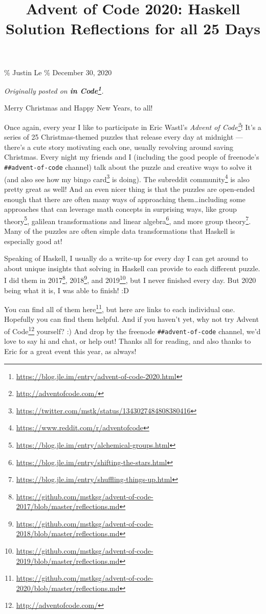 \documentclass[]{article}
\title{Advent of Code 2020: Haskell Solution Reflections for all 25 Days}
\renewcommand{\href}[2]{#2\footnote{\url{#1}}}
\begin{document}
\maketitle

\% Justin Le \% December 30, 2020

\emph{Originally posted on
\textbf{\href{https://blog.jle.im/entry/advent-of-code-2020.html}{in Code}}.}

Merry Christmas and Happy New Years, to all!

Once again, every year I like to participate in Eric Wastl's
\emph{\href{http://adventofcode.com/}{Advent of Code}}! It's a series of 25
Christmas-themed puzzles that release every day at midnight --- there's a cute
story motivating each one, usually revolving around saving Christmas. Every
night my friends and I (including the good people of freenode's
\texttt{\#\#advent-of-code} channel) talk about the puzzle and creative ways to
solve it (and also see how my
\href{https://twitter.com/mstk/status/1343027484808380416}{bingo card} is
doing). The \href{https://www.reddit.com/r/adventofcode}{subreddit community} is
also pretty great as well! And an even nicer thing is that the puzzles are
open-ended enough that there are often many ways of approaching
them\ldots including some approaches that can leverage math concepts in
surprising ways, like
\href{https://blog.jle.im/entry/alchemical-groups.html}{group theory},
\href{https://blog.jle.im/entry/shifting-the-stars.html}{galilean
transformations and linear algebra}, and
\href{https://blog.jle.im/entry/shuffling-things-up.html}{more group theory}.
Many of the puzzles are often simple data transformations that Haskell is
especially good at!

Speaking of Haskell, I usually do a write-up for every day I can get around to
about unique insights that solving in Haskell can provide to each different
puzzle. I did them in
\href{https://github.com/mstksg/advent-of-code-2017/blob/master/reflections.md}{2017},
\href{https://github.com/mstksg/advent-of-code-2018/blob/master/reflections.md}{2018},
and
\href{https://github.com/mstksg/advent-of-code-2019/blob/master/reflections.md}{2019},
but I never finished every day. But 2020 being what it is, I was able to finish!
:D

You can find
\href{https://github.com/mstksg/advent-of-code-2020/blob/master/reflections.md}{all
of them here}, but here are links to each individual one. Hopefully you can find
them helpful. And if you haven't yet, why not try
\href{http://adventofcode.com/}{Advent of Code} yourself? :) And drop by the
freenode \texttt{\#\#advent-of-code} channel, we'd love to say hi and chat, or
help out! Thanks all for reading, and also thanks to Eric for a great event this
year, as always!
\end{document}
